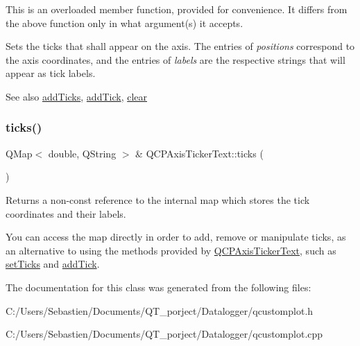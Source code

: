 This is an overloaded member function, provided for convenience. It differs from the above function only in what argument(s) it accepts.

Sets the ticks that shall appear on the axis. The entries of {\itshape positions} correspond to the axis coordinates, and the entries of {\itshape labels} are the respective strings that will appear as tick labels.

\begin{DoxySeeAlso}{See also}
\hyperlink{class_q_c_p_axis_ticker_text_aba34051300eecaefbedb2df8feff2d45}{add\+Ticks}, \hyperlink{class_q_c_p_axis_ticker_text_aada3db69e5fc6585aaa4ea5d89552eb0}{add\+Tick}, \hyperlink{class_q_c_p_axis_ticker_text_a21826d2fcd9a25c194d34d4f67aa1460}{clear} 
\end{DoxySeeAlso}
\mbox{\label{class_q_c_p_axis_ticker_text_ac84622a6bb4f2a98474e185ecaf3189a}} 
\subsubsection{\texorpdfstring{ticks()}{ticks()}}
{\footnotesize\ttfamily Q\+Map$<$ double, Q\+String $>$ \& Q\+C\+P\+Axis\+Ticker\+Text\+::ticks (\begin{DoxyParamCaption}{ }\end{DoxyParamCaption})\hspace{0.3cm}{\ttfamily [inline]}}

Returns a non-\/const reference to the internal map which stores the tick coordinates and their labels.

You can access the map directly in order to add, remove or manipulate ticks, as an alternative to using the methods provided by \hyperlink{class_q_c_p_axis_ticker_text}{Q\+C\+P\+Axis\+Ticker\+Text}, such as \hyperlink{class_q_c_p_axis_ticker_text_a8cdf1f21940f1f53f5e3d30b2c74f5cf}{set\+Ticks} and \hyperlink{class_q_c_p_axis_ticker_text_aada3db69e5fc6585aaa4ea5d89552eb0}{add\+Tick}. 

The documentation for this class was generated from the following files\+:\begin{DoxyCompactItemize}
\item 
C\+:/\+Users/\+Sebastien/\+Documents/\+Q\+T\+\_\+porject/\+Datalogger/qcustomplot.\+h\item 
C\+:/\+Users/\+Sebastien/\+Documents/\+Q\+T\+\_\+porject/\+Datalogger/qcustomplot.\+cpp\end{DoxyCompactItemize}
